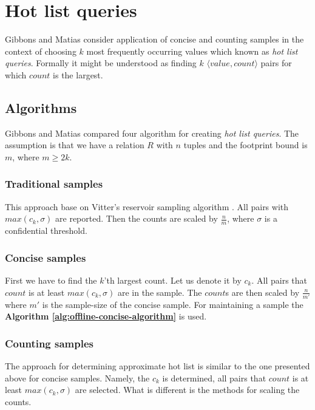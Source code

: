 \section{Hot list queries}
Gibbons and Matias consider application of concise and counting
samples in the context of choosing $k$ most frequently occurring
values which known as \textit{hot list queries}. Formally it might be
understood as finding $k$ $\langle value, count \rangle$ pairs for
which $count$ is the largest.

\subsection{Algorithms}
Gibbons and Matias \cite{GM98} compared four algorithm for creating
\textit{hot list queries}. The assumption is that we have a relation
$R$ with $n$ tuples and the footprint bound is $m$, where $m \geq 2k$.

\subsubsection{Traditional samples}
This approach base on Vitter's reservoir sampling algorithm
\cite{Vit85}.
All pairs with $max(c_k, \sigma)$ are reported. Then the counts are
scaled by $\frac{n}{m}$, where $\sigma$ is a confidential threshold.

\subsubsection{Concise samples}
First we have to find the $k$'th largest count. Let us denote it by
$c_k$. All pairs that $count$ is at least $max(c_k, \sigma)$ are in
the sample. The $count$s are then scaled by $\frac{n}{m'}$ where $m'$
is the sample-size of the concise sample.
For maintaining a sample the \textbf{Algorithm
  \ref{alg:offline-concise-algorithm}} is used.

\subsubsection{Counting samples}
The approach for determining approximate hot list is similar to the
one presented above for concise samples. Namely, the $c_k$ is
determined, all pairs that $count$ is at least $max(c_k, \sigma)$ are
selected. What is different is the methods for scaling the counts.

